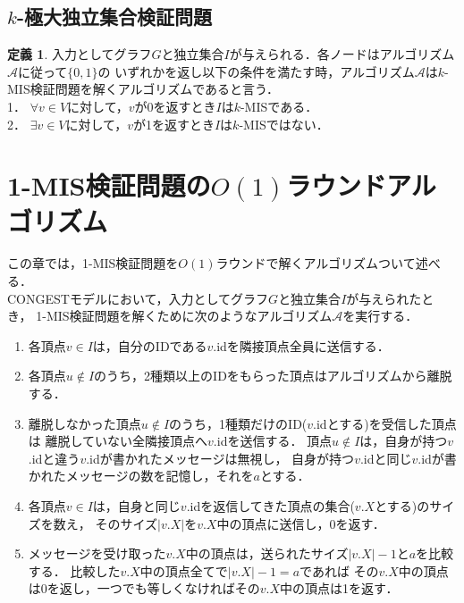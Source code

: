 \documentclass[12pt]{thesis}
\newcommand{\CONGEST}{\textsf{CONGEST}}
\theoremstyle{definition}
\newtheorem{definition}{定義}[chapter]
\begin{document}
\section{$k$-極大独立集合検証問題}
\begin{definition}
入力としてグラフ$G$と独立集合$I$が与えられる．各ノードはアルゴリズム$\mathcal{A}$に従って$\{0,1\}$の
いずれかを返し以下の条件を満たす時，アルゴリズム$\mathcal{A}$は$k$-MIS検証問題を解くアルゴリズムであると言う．\\
1． $\forall v\in V$に対して，$v$が0を返すとき$I$は$k$-MISである．\\
2． $\exists v \in V$に対して，$v$が1を返すとき$I$は$k$-MISではない．
\end{definition}
\newpage

\chapter{1-MIS検証問題の$O(1)$ラウンドアルゴリズム}
この章では，1-MIS検証問題を$O(1)$ラウンドで解くアルゴリズムついて述べる． \\
{\CONGEST}モデルにおいて，入力としてグラフ$G$と独立集合$I$が与えられたとき，
1-MIS検証問題を解くために次のようなアルゴリズム$\mathcal{A}$を実行する．
\begin{enumerate}
\item 各頂点$v \in I$は，自分のIDである$v$.idを隣接頂点全員に送信する．
\item 各頂点$u \notin I$のうち，2種類以上のIDをもらった頂点はアルゴリズムから離脱する．
\item 離脱しなかった頂点$u \notin I$のうち，1種類だけのID($v$.idとする)を受信した頂点は
離脱していない全隣接頂点へ$v$.idを送信する．
頂点$u \notin I$は，自身が持つ$v$.idと違う$v$.idが書かれたメッセージは無視し，
自身が持つ$v$.idと同じ$v$.idが書かれたメッセージの数を記憶し，それを$a$とする．
\item 各頂点$v \in I$は，自身と同じ$v$.idを返信してきた頂点の集合($v.X$とする)のサイズを数え，
そのサイズ$|v.X|$を$v.X$中の頂点に送信し，0を返す．
\item メッセージを受け取った$v.X$中の頂点は，送られたサイズ$|v.X| - 1$と$a$を比較する．
比較した$v.X$中の頂点全てで$|v.X| - 1 = a$であれば
その$v.X$中の頂点は0を返し，一つでも等しくなければその$v.X$中の頂点は1を返す．
\end{enumerate}
\end{document}

